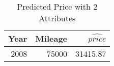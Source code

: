 \begin{table}[ht]
\centering
\begin{tabular}{rrr}
  \hline
Year & Mileage & $\widehat{price}$ \\ 
  \hline
2008 & 75000 & 31415.87 \\ 
   \hline
\end{tabular}
\caption{Predicted Price with 2 Attributes} 
\label{tab:2p_predict}
\end{table}
